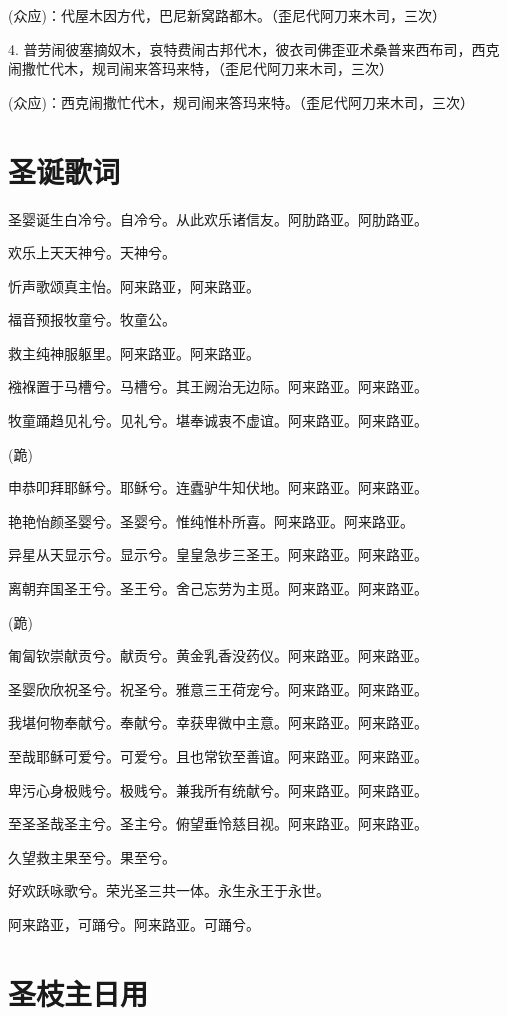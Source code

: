 \documentclass[UTF8,17pt]{ctexart}
\begin{document}
(众应)：代屋⽊因⽅代，巴尼新窝路都⽊。（歪尼代阿⼑来⽊司，三次）

4. 普劳闹彼塞摘奴⽊，哀特费闹古邦代⽊，彼⾐司佛歪亚术桑普来西布司，西克闹撒忙代⽊，规司闹来答玛来特，（歪尼代阿⼑来⽊司，三次）

(众应)：西克闹撒忙代⽊，规司闹来答玛来特。（歪尼代阿⼑来⽊司，三次）

\section{圣诞歌词}

圣婴诞⽣⽩冷兮。⾃冷兮。从此欢乐诸信友。阿肋路亚。阿肋路亚。

欢乐上天天神兮。天神兮。

忻声歌颂真主怡。阿来路亚，阿来路亚。

福⾳预报牧童兮。牧童公。

救主纯神服躯⾥。阿来路亚。阿来路亚。

襁褓置于马槽兮。马槽兮。其王阙治⽆边际。阿来路亚。阿来路亚。

牧童踊趋见礼兮。见礼兮。堪奉诚衷不虚谊。阿来路亚。阿来路亚。

(跪)

申恭叩拜耶稣兮。耶稣兮。连蠹驴⽜知伏地。阿来路亚。阿来路亚。

艳艳怡颜圣婴兮。圣婴兮。惟纯惟朴所喜。阿来路亚。阿来路亚。

异星从天显⽰兮。显⽰兮。皇皇急步三圣王。阿来路亚。阿来路亚。

离朝弃国圣王兮。圣王兮。舍己忘劳为主觅。阿来路亚。阿来路亚。

(跪)

匍匐钦崇献贡兮。献贡兮。黄⾦乳⾹没药仪。阿来路亚。阿来路亚。

圣婴欣欣祝圣兮。祝圣兮。雅意三王荷宠兮。阿来路亚。阿来路亚。

我堪何物奉献兮。奉献兮。幸获卑微中主意。阿来路亚。阿来路亚。

⾄哉耶稣可爱兮。可爱兮。且也常钦⾄善谊。阿来路亚。阿来路亚。

卑污⼼⾝极贱兮。极贱兮。兼我所有统献兮。阿来路亚。阿来路亚。

⾄圣圣哉圣主兮。圣主兮。俯望垂怜慈⽬视。阿来路亚。阿来路亚。

久望救主果⾄兮。果⾄兮。

好欢跃咏歌兮。荣光圣三共⼀体。永⽣永王于永世。

阿来路亚，可踊兮。阿来路亚。可踊兮。

\section{圣枝主⽇⽤}
\end{document}
